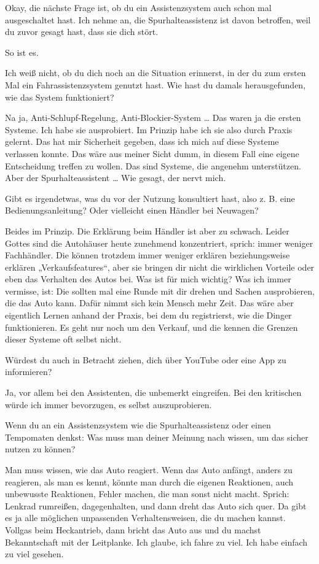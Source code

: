 \interviewerin
Okay, die nächste Frage ist, ob du ein Assistenzsystem auch schon mal
ausgeschaltet hast. Ich nehme an, die Spurhalteassistenz ist davon
betroffen, weil du zuvor gesagt hast, dass sie dich stört.

So ist es.

\interviewerin
Ich weiß nicht, ob du dich noch an die Situation erinnerst, in der du
zum ersten Mal ein Fahrassistenzsystem genutzt hast. Wie hast du damals
herausgefunden, wie das System funktioniert?

Na ja, Anti-Schlupf-Regelung, Anti-Blockier-System … Das waren ja die
ersten Systeme. Ich habe sie ausprobiert. Im Prinzip habe ich sie also
durch Praxis gelernt. Das hat mir Sicherheit gegeben, dass ich mich auf
diese Systeme verlassen konnte. Das wäre aus meiner Sicht dumm, in
diesem Fall eine eigene Entscheidung treffen zu wollen. Das sind
Systeme, die angenehm unterstützen. Aber der Spurhalteassistent … Wie
gesagt, der nervt mich.

\interviewerin
Gibt es irgendetwas, was du vor der Nutzung konsultiert hast, also z. B.
eine Bedienungsanleitung? Oder vielleicht einen Händler bei Neuwagen?

Beides im Prinzip. Die Erklärung beim Händler ist aber zu schwach.
Leider Gottes sind die Autohäuser heute zunehmend konzentriert, sprich:
immer weniger Fachhändler. Die können trotzdem immer weniger erklären
beziehungsweise erklären „Verkaufsfeatures“, aber sie bringen dir nicht
die wirklichen Vorteile oder eben das Verhalten des Autos bei. Was ist
für mich wichtig? Was ich immer vermisse, ist: Die sollten mal eine
Runde mit dir drehen und Sachen ausprobieren, die das Auto kann. Dafür
nimmt sich kein Mensch mehr Zeit. Das wäre aber eigentlich Lernen anhand
der Praxis, bei dem du registrierst, wie die Dinger funktionieren. Es
geht nur noch um den Verkauf, und die kennen die Grenzen dieser Systeme
oft selbst nicht.

\interviewerin
Würdest du auch in Betracht ziehen, dich über YouTube oder eine App zu
informieren?

Ja, vor allem bei den Assistenten, die unbemerkt eingreifen. Bei den
kritischen würde ich immer bevorzugen, es selbst auszuprobieren.

\interviewerin
Wenn du an ein Assistenzsystem wie die Spurhalteassistenz oder einen
Tempomaten denkst: Was muss man deiner Meinung nach wissen, um das
sicher nutzen zu können?

Man muss wissen, wie das Auto reagiert. Wenn das Auto anfängt, anders
zu reagieren, als man es kennt, könnte man durch die eigenen Reaktionen,
auch unbewusste Reaktionen, Fehler machen, die man sonst nicht macht.
Sprich: Lenkrad rumreißen, dagegenhalten, und dann dreht das Auto sich
quer. Da gibt es ja alle möglichen unpassenden Verhaltensweisen, die du
machen kannst. Vollgas beim Heckantrieb, dann bricht das Auto aus und du
machst Bekanntschaft mit der Leitplanke. Ich glaube, ich fahre zu viel.
Ich habe einfach zu viel gesehen.

